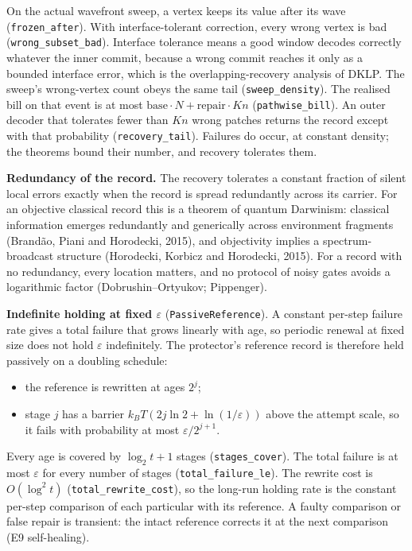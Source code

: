 \documentclass[
]{article}
\providecommand{\tightlist}{%
  \setlength{\itemsep}{0pt}\setlength{\parskip}{0pt}}
\begin{document}
On the actual wavefront sweep, a vertex keeps its value after its wave
(\texttt{frozen\_after}). With interface-tolerant correction, every
wrong vertex is bad (\texttt{wrong\_subset\_bad}). Interface tolerance
means a good window decodes correctly whatever the inner commit, because
a wrong commit reaches it only as a bounded interface error, which is
the overlapping-recovery analysis of DKLP. The sweep's wrong-vertex
count obeys the same tail (\texttt{sweep\_density}). The realised bill
on that event is at most
\(\mathrm{base}\cdot N+\mathrm{repair}\cdot Kn\)
(\texttt{pathwise\_bill}). An outer decoder that tolerates fewer than
\(Kn\) wrong patches returns the record except with that probability
(\texttt{recovery\_tail}). Failures do occur, at constant density; the
theorems bound their number, and recovery tolerates them.

\textbf{Redundancy of the record.} The recovery tolerates a constant
fraction of silent local errors exactly when the record is spread
redundantly across its carrier. For an objective classical record this
is a theorem of quantum Darwinism: classical information emerges
redundantly and generically across environment fragments (Brandão, Piani
and Horodecki, 2015), and objectivity implies a spectrum-broadcast
structure (Horodecki, Korbicz and Horodecki, 2015). For a record with no
redundancy, every location matters, and no protocol of noisy gates
avoids a logarithmic factor (Dobrushin--Ortyukov; Pippenger).

\textbf{Indefinite holding at fixed \(\varepsilon\)}
(\texttt{PassiveReference}). A constant per-step failure rate gives a
total failure that grows linearly with age, so periodic renewal at fixed
size does not hold \(\varepsilon\) indefinitely. The protector's
reference record is therefore held passively on a doubling schedule:

\begin{itemize}
\tightlist
\item
  the reference is rewritten at ages \(2^j\);
\item
  stage \(j\) has a barrier \(k_BT(2j\ln2+\ln(1/\varepsilon))\) above
  the attempt scale, so it fails with probability at most
  \(\varepsilon/2^{j+1}\).
\end{itemize}

Every age is covered by \(\log_2t+1\) stages (\texttt{stages\_cover}).
The total failure is at most \(\varepsilon\) for every number of stages
(\texttt{total\_failure\_le}). The rewrite cost is \(O(\log^2t)\)
(\texttt{t\allowbreak{}o\allowbreak{}t\allowbreak{}a\allowbreak{}l\allowbreak{}\_\allowbreak{}r\allowbreak{}e\allowbreak{}w\allowbreak{}r\allowbreak{}i\allowbreak{}t\allowbreak{}e\allowbreak{}\_\allowbreak{}c\allowbreak{}o\allowbreak{}s\allowbreak{}t}),
so the long-run holding rate is the constant per-step comparison of each
particular with its reference. A faulty comparison or false repair is
transient: the intact reference corrects it at the next comparison (E9
self-healing).
\end{document}
